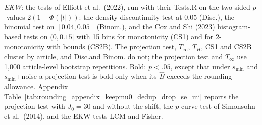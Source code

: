 \begin{table}[htbp]
\begin{minipage}{\linewidth}
\textit{EKW}: the tests of Elliott et al.\ (2022), run with their Tests.R on the two-sided $p$-values $2(1-\Phi(|t|))$: the density discontinuity test at 0.05 (Disc.), the binomial test on $[0.04,0.05]$ (Binom.), and the Cox and Shi (2023) histogram-based tests on $(0,0.15]$ with 15 bins for monotonicity (CS1) and for 2-monotonicity with bounds (CS2B).
The projection test, $T_\infty$, $T_H$, CS1 and CS2B cluster by article, and Disc.\@ and Binom. do not; the projection test and $T_\infty$ use 1,000 article-level bootstrap repetitions.
Bold: $p<.05$, except that under $s_{\min}$ and $s_{\min}$+noise a projection test is bold only when its $\widehat{B}$ exceeds the rounding allowance.
Appendix Table~\ref{tab:rounding_appendix_keepmu0_dedup_drop_se_mi} reports the projection test with $J_0=30$ and without the shift, the $p$-curve test of Simonsohn et al.\ (2014), and the EKW tests LCM and Fisher.
\end{minipage}
\end{table}
